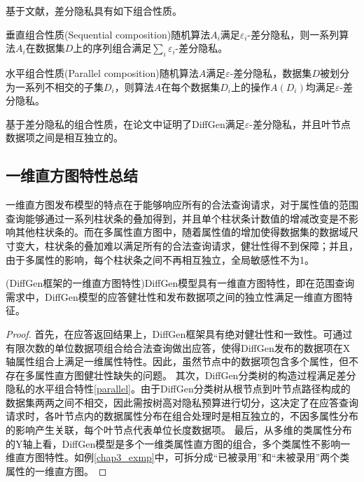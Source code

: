 基于文献\cite{composition}，差分隐私具有如下组合性质。

\begin{lem}
	垂直组合性质(Sequential composition)\cite{composition}随机算法$A_{i}$满足$\varepsilon_{i}$-差分隐私，则一系列算法$A_{i}$在数据集$D$上的序列组合满足$\sum\limits_i \varepsilon_{i}$-差分隐私。
\end{lem}

\begin{lem}
	\label{parallel}
	水平组合性质(Parallel composition)\cite{composition}随机算法$A$满足$\varepsilon$-差分隐私，数据集$D$被划分为一系列不相交的子集$D_{i}$，则算法$A$在每个数据集$D_{i}$上的操作$A(D_{i})$均满足$\varepsilon$-差分隐私。
\end{lem}


基于差分隐私的组合性质，在论文\cite{DiffGen}中证明了DiffGen满足$\varepsilon$-差分隐私，并且叶节点数据项之间是相互独立的。

\subsection{一维直方图特性总结} %


一维直方图发布模型的特点在于能够响应所有的合法查询请求，对于属性值的范围查询能够通过一系列柱状条的叠加得到，并且单个柱状条计数值的增减改变是不影响其他柱状条的。而在多属性直方图中，随着属性值的增加使得数据集的数据域尺寸变大，柱状条的叠加难以满足所有的合法查询请求，健壮性得不到保障；并且，由于多属性的影响，每个柱状条之间不再相互独立，全局敏感性不为1。

\begin{prop}
	\label{chap4_prop4}
	(DiffGen框架的一维直方图特性)DiffGen模型具有一维直方图特性，即在范围查询需求中，DiffGen模型的应答健壮性和发布数据项之间的独立性满足一维直方图特征。
\end{prop}
\begin{proof}
	首先，在应答返回结果上，DiffGen框架具有绝对健壮性和一致性。可通过有限次数的单位数据项组合给合法查询做出应答，使得DiffGen发布的数据项在X轴属性组合上满足一维属性特性。因此，虽然节点中的数据项包含多个属性，但不存在多属性直方图健壮性缺失的问题。%
	其次，DiffGen分类树的构造过程满足差分隐私的水平组合特性\ref{parallel}。由于DiffGen分类树从根节点到叶节点路径构成的数据集两两之间不相交，因此需按树高对隐私预算进行切分，这决定了在应答查询请求时，各叶节点内的数据属性分布在组合处理时是相互独立的，不因多属性分布的影响产生关联，每个叶节点代表单位长度数据项。
	最后，从多维的类属性分布的Y轴上看，DiffGen模型是多个一维类属性直方图的组合，多个类属性不影响一维直方图特性。如例\ref{chap3_exmp}中，可拆分成“已被录用”和“未被录用”两个类属性的一维直方图。
\end{proof}



